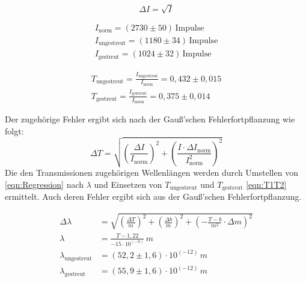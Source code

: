 \documentclass[titlepage = firstcover]{scrartcl}
\begin{document}
        \begin{equation*}
            \Delta I = \sqrt{I}
        \end{equation*}

        \begin{align*}
            I_{\text{norm}} = (2730 \pm 50) \, \text{Impulse}\\
            I_{\text{ungestreut}} = (1180 \pm 34) \, \text{Impulse}\\
            I_{\text{gestreut}} = (1024 \pm 32) \, \text{Impulse}
        \end{align*}
        
        \begin{align}
            T_{\text{ungestreut}} = \frac{I_{\text{ungestreut}}}{I_{\text{norm}}}=0,432 \pm 0,015 \nonumber\\
            T_{\text{gestreut}} = \frac{I_{\text{gestreut}}}{I_{\text{norm}}}=0,375 \pm 0,014 
            \label{eqn:T1T2}
        \end{align}

        \noindent
        Der zugehörige Fehler ergibt sich nach der Gauß'schen Fehlerfortpflanzung wie folgt:     
        \begin{equation*}
            \Delta T = \sqrt{\left( \frac{\Delta I}{I_{\text{norm}}}\right)^2 + \left(\frac{I \cdot \Delta I_{\text{norm}}}{I_{\text{norm}}^2}\right)^2}
        \end{equation*}
        \noindent
        Die den Transmissionen zugehörigen Wellenlängen werden durch Umstellen von \ref{eqn:Regression} nach $\lambda$ und Einsetzen von $T_{\text{ungestreut}}$
        und $T_{\text{gestreut}}$ \ref{eqn:T1T2} ermittelt. Auch deren Fehler ergibt sich aus der Gauß'schen Fehlerfortpflanzung.

        \begin{align}
            \Delta \lambda &= \sqrt{\left(\frac{\Delta T}{m}\right)^2 + \left(\frac{\Delta b}{m}\right)^2 + \left(-\frac{T-b}{m^2} \cdot \Delta m\right)^2} \nonumber \\
            \lambda &= \frac{T - 1,22}{-15\cdot 10^{\left(-9\right)}} \, m \\
            \lambda_{\text{ungestreut}} &= (52,2 \pm 1,6) \cdot 10^{\left(-12\right)} \, m \nonumber \\
            \lambda_{\text{gestreut}} &= (55,9 \pm 1,6) \cdot 10^{\left(-12\right)} \, m \nonumber
            \label{eqn:y1,y2}
        \end{align}
\end{document}
